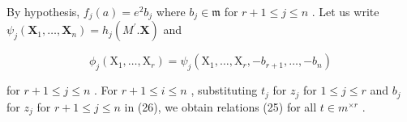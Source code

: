 By hypothesis, \(f_{j}(a) = e^{2}b_{j}\) where \(b_{j} \in \mathfrak{m}\) for \(r + 1 \leqslant j \leqslant n\) . Let us write \(\psi_{j}(\mathbf{X}_{1},\ldots ,\mathbf{X}_{n}) = h_{j}(M^{\prime}.\mathbf{X})\) and

\[
\phi_ {j} \left(\mathrm{X} _ {1}, \dots , \mathrm{X} _ {r}\right) = \psi_ {j} \left(\mathrm{X} _ {1}, \dots , \mathrm{X} _ {r}, - b _ {r + 1}, \dots , - b _ {n}\right)
\]

for \(r + 1 \leqslant j \leqslant n\) . For \(r + 1 \leqslant i \leqslant n\) , substituting \(t_j\) for \(z_j\) for \(1 \leqslant j \leqslant r\) and \(b_j\) for \(z_j\) for \(r + 1 \leqslant j \leqslant n\) in (26), we obtain relations (25) for all \(t \in m^{\times r}\) .

